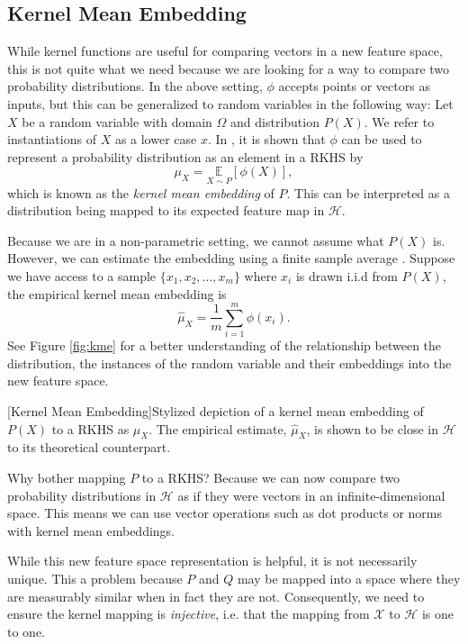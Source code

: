 \subsection{Kernel Mean Embedding}
\label{kernel_mean_emb}
While kernel functions are useful for comparing vectors in a new feature space, this is not quite what we need because we are looking for a way to compare two probability distributions. In the above setting, $\phi$ accepts points or vectors as inputs, but this can be generalized to random variables in the following way: Let $X$ be a random variable with domain $\Omega$ and distribution $P(X)$. We refer to instantiations of $X$ as a lower case $x$. In \cite{smola2007hilbert}, it is shown that $\phi$ can be used to represent a probability distribution as an element in a RKHS by
\begin{equation}
\mu_X =\underset{X \sim P} {\mathbb{E}}[\phi(X)],
\end{equation}
which is known as the \textit{kernel mean embedding} of $P$. This can be interpreted as a  distribution being mapped to its expected feature map in $\mathcal{H}$. 

Because we are in a non-parametric setting, we cannot assume what $P(X)$ is. However, we can estimate the embedding using a finite sample average  \cite{smola2007hilbert}. Suppose we have access to a sample $\{x_1, x_2, ..., x_m\}$ where $x_i$ is drawn i.i.d from $P(X)$, the empirical kernel mean embedding is 
\begin{equation}
\hat{\mu}_X = \frac{1}{m} \sum_{i=1}^m \phi(x_i).
\end{equation}
See Figure \ref{fig:kme} for a better understanding of the relationship between the distribution, the instances of the random variable and their embeddings into the new feature space.
\begin{center} 
[Kernel Mean Embedding]{Stylized depiction of a kernel mean embedding of $P(X)$ to a RKHS as $\mu_X$. The empirical estimate, $\hat{\mu}_X$, is shown to be close in $\mathcal{H}$ to its theoretical counterpart.} 
\label{fig:kme} 
\end{center}

Why bother mapping $P$ to a RKHS? Because we can now compare two probability distributions in $\mathcal{H}$ as if they were vectors in an infinite-dimensional space. This means we can use vector operations such as dot products or norms with kernel mean embeddings.

While this new feature space representation is helpful, it is not necessarily unique. This a problem because $P$ and $Q$ may be mapped into a space where they are measurably similar when in fact they are not. Consequently, we need to ensure the kernel mapping is \textit{injective}, i.e. that the mapping from $\mathcal{X}$ to  $\mathcal{H}$ is one to one. %

